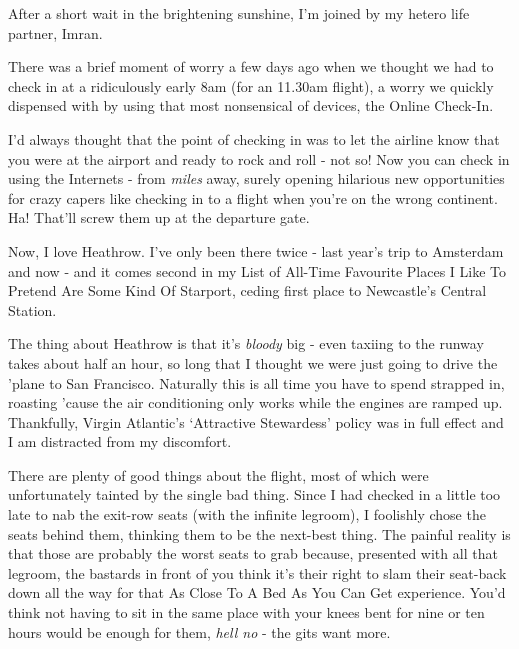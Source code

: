 \documentclass[a5paper,titlepage,11pt,draft]{book}
\begin{document}
After a short wait in the brightening sunshine, I'm joined by my hetero life partner, Imran.

There was a brief moment of worry a few days ago when we thought we had to check in at a ridiculously early 8am (for an 11.30am flight), a worry we quickly dispensed with by using that most nonsensical of devices, the Online Check-In.

I'd always thought that the point of checking in was to let the airline know that you were at the airport and ready to rock and roll - not so!  Now you can check in using the Internets - from \emph{miles} away, surely opening hilarious new opportunities for crazy capers like checking in to a flight when you're on the wrong continent.  Ha!  That'll screw them up at the departure gate.

Now, I love Heathrow.  I've only been there twice - last year's trip to Amsterdam and now - and it comes second in my List of All-Time Favourite Places I Like To Pretend Are Some Kind Of Starport, ceding first place to Newcastle's Central Station.

The thing about Heathrow is that it's \emph{bloody} big - even taxiing to the runway takes about half an hour, so long that I thought we were just going to drive the 'plane to San Francisco.  Naturally this is all time you have to spend strapped in, roasting 'cause the air conditioning only works while the engines are ramped up.  Thankfully, Virgin Atlantic's `Attractive Stewardess' policy was in full effect and I am distracted from my discomfort.

There are plenty of good things about the flight, most of which were unfortunately tainted by the single bad thing.  Since I had checked in a little too late to nab the exit-row seats (with the infinite legroom), I foolishly chose the seats behind them, thinking them to be the next-best thing.   The painful reality is that those are probably the worst seats to grab because, presented with all that legroom, the bastards in front of you think it's their right to slam their seat-back down all the way for that As Close To A Bed As You Can Get experience.  You'd think not having to sit in the same place with your knees bent for nine or ten hours would be enough for them, \emph{hell no} - the gits want more.

\end{document}
